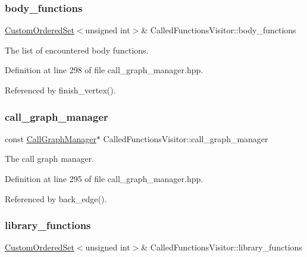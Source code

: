 \subsubsection{\texorpdfstring{body\+\_\+functions}{body\_functions}}
{\footnotesize\ttfamily \hyperlink{classCustomOrderedSet}{Custom\+Ordered\+Set}$<$unsigned int$>$\& Called\+Functions\+Visitor\+::body\+\_\+functions\hspace{0.3cm}{\ttfamily [private]}}



The list of encountered body functions. 



Definition at line 298 of file call\+\_\+graph\+\_\+manager.\+hpp.



Referenced by finish\+\_\+vertex().

\mbox{\label{structCalledFunctionsVisitor_a1b3c58fef5ca0bcf71281c9b721d46fa}} 
\subsubsection{\texorpdfstring{call\+\_\+graph\+\_\+manager}{call\_graph\_manager}}
{\footnotesize\ttfamily const \hyperlink{classCallGraphManager}{Call\+Graph\+Manager}$\ast$ Called\+Functions\+Visitor\+::call\+\_\+graph\+\_\+manager\hspace{0.3cm}{\ttfamily [private]}}



The call graph manager. 



Definition at line 295 of file call\+\_\+graph\+\_\+manager.\+hpp.



Referenced by back\+\_\+edge().

\mbox{\label{structCalledFunctionsVisitor_ad67878eadef3ee07427510ce4c8e8aaf}} 
\subsubsection{\texorpdfstring{library\+\_\+functions}{library\_functions}}
{\footnotesize\ttfamily \hyperlink{classCustomOrderedSet}{Custom\+Ordered\+Set}$<$unsigned int$>$\& Called\+Functions\+Visitor\+::library\+\_\+functions\hspace{0.3cm}{\ttfamily [private]}}



